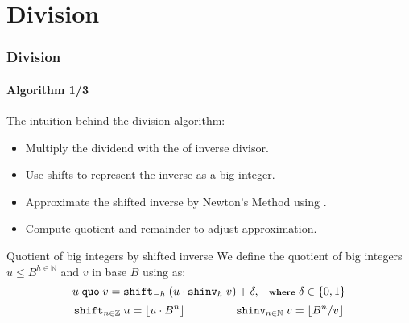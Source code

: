 \section{Division}
\begin{frame}[fragile]
  \frametitle{Division}
  \framesubtitle{Algorithm 1/3}
  The intuition behind the division algorithm:
        \begin{itemize}\footnotesize
            \item Multiply the dividend with the of inverse divisor.
                \pause
              \item Use shifts to represent the inverse as a big integer.
                \pause
              \item Approximate the shifted inverse by Newton's Method using \cite{watt2023efficient}.
                \pause
              \item Compute quotient and remainder to adjust approximation.
              \end{itemize}\vspace*{0.6em}\pause

              \begin{block}{Quotient of big integers by shifted inverse}\scriptsize
              We define the quotient of big integers $u\leq B^{h\in \mathbb{N}}$ and $v$ in base $B$ using \cite{watt2023efficient} as:\vspace*{-0.3em}
              \begin{equation}
    \scriptsize
    u~\mathtt{quo}~v = \mathtt{shift}_{-h}~ (u \cdot \mathtt{shinv}_h~v) + \delta,\quad \textbf{where~} \delta \in \{0,1\}
  \end{equation}\vspace*{-1.5em}
              \begin{equation}\scriptsize
    \mathtt{shift}_{n\in\mathbb{Z}}~u = \lfloor u \cdot B^n \rfloor \qquad \qquad \quad ~\,\, \mathtt{shinv}_{n\in\mathbb{N}}~v = \lfloor B^{n}/ v \rfloor
  \end{equation}
  \end{block}
      \end{frame}

